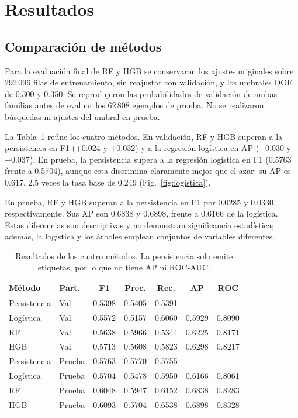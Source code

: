 \documentclass[conference]{IEEEtran}
\begin{document}
\section{Resultados}
\subsection{Comparación de métodos}
Para la evaluación final de RF y HGB se conservaron los ajustes originales sobre 292\,096 filas de entrenamiento, sin reajustar con validación, y los umbrales OOF de 0.300 y 0.350. Se reprodujeron las probabilidades de validación de ambas familias antes de evaluar los 62\,808 ejemplos de prueba. No se realizaron búsquedas ni ajustes del umbral en prueba.

La Tabla~\ref{tab:resultados} reúne los cuatro métodos. En validación, RF y HGB superan a la persistencia en F1 (+0.024 y +0.032) y a la regresión logística en AP (+0.030 y +0.037). En prueba, la persistencia supera a la regresión logística en F1 (0.5763 frente a 0.5704), aunque esta discrimina claramente mejor que el azar: su AP es 0.617, 2.5 veces la tasa base de 0.249 (Fig.~\ref{fig:logistica}).

En prueba, RF y HGB superan a la persistencia en F1 por 0.0285 y 0.0330, respectivamente. Sus AP son 0.6838 y 0.6898, frente a 0.6166 de la logística. Estas diferencias son descriptivas y no demuestran significancia estadística; además, la logística y los árboles emplean conjuntos de variables diferentes.

\begin{table}[htbp]
\caption{Resultados de los cuatro métodos. La persistencia solo emite etiquetas, por lo que no tiene AP ni ROC-AUC.}
\label{tab:resultados}
\centering
\small
\setlength{\tabcolsep}{4pt}
\begin{tabular}{llccccc}
\toprule
Método & Part. & F1 & Prec. & Rec. & AP & ROC \\
\midrule
Persistencia & Val. & 0.5398 & 0.5405 & 0.5391 & -- & -- \\
Logística & Val. & 0.5572 & 0.5157 & 0.6060 & 0.5929 & 0.8090 \\
RF & Val. & 0.5638 & 0.5966 & 0.5344 & 0.6225 & 0.8171 \\
HGB & Val. & 0.5713 & 0.5608 & 0.5823 & 0.6298 & 0.8217 \\
\midrule
Persistencia & Prueba & 0.5763 & 0.5770 & 0.5755 & -- & -- \\
Logística & Prueba & 0.5704 & 0.5478 & 0.5950 & 0.6166 & 0.8061 \\
RF & Prueba & 0.6048 & 0.5947 & 0.6152 & 0.6838 & 0.8283 \\
HGB & Prueba & 0.6093 & 0.5704 & 0.6538 & 0.6898 & 0.8328 \\
\bottomrule
\end{tabular}
\end{table}
\end{document}
